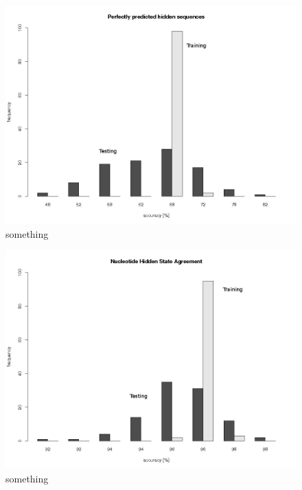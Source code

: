 \begin{figure}[ht]
	\begin{center}
		\includegraphics[scale=0.42]{pics/perfectm.jpg}
	\caption{something}
	\end{center}
	\label{fig:perfect}
\end{figure}

\begin{figure}[ht]
	\begin{center}
		\includegraphics[scale=0.42]{pics/stateAgreementm.jpg}
	\caption{something}
	\end{center}
	\label{fig:stateAgreement}
\end{figure}



